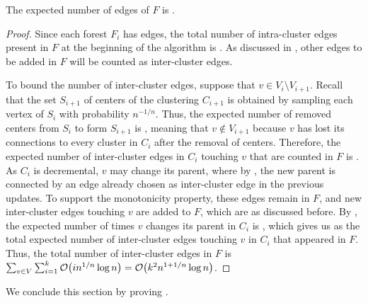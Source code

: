 \begin{lemma} \label{lem:app_size}
The expected number of edges of \( F \) is .
\end{lemma}
\begin{proof}
Since each forest \( F_i \) has  edges, the total number of intra-cluster edges present in \( F \) at the beginning of the algorithm is .
As discussed in , other edges to be added in \( F \) will be counted as inter-cluster edges.

To bound the number of inter-cluster edges, suppose that \( v \in V_i \setminus V_{i + 1} \).
Recall that the set \( S_{i + 1} \) of centers of the clustering \( C_{i + 1} \) is obtained by sampling each vertex of \( S_i \) with probability \( n ^{-1/n} \).
Thus, the expected number of removed centers from \( S_i \) to form \( S_{i + 1} \) is , meaning that \( v \notin V_{i + 1} \) because \( v \) has lost its connections to every cluster in \( C_i \) after the removal of  centers.
Therefore, the expected number of inter-cluster edges in \( C_i \) touching \( v \) that are counted in \( F \) is .
As \( C_i \) is decremental, \( v \) may change its parent, where by , the new parent is connected by an edge already chosen as inter-cluster edge in the previous updates.
To support the monotonicity property, these edges remain in \( F \), and new inter-cluster edges touching \( v \) are added to \( F \), which are  as discussed before.
By , the expected number of times \( v \) changes its parent in \( C_i \) is , which gives us  as the total expected number of inter-cluster edges touching \( v \) in \( C_i \) that appeared in \( F \).
Thus, the total number of inter-cluster edges in \( F \) is \( \sum _{v \in V} \sum _{i = 1} ^ k \atmost{i n^{1/n} \log n } = \atmost{k^2 n^{1 + 1/n} \log n } \).
\end{proof}


We conclude this section by proving .

